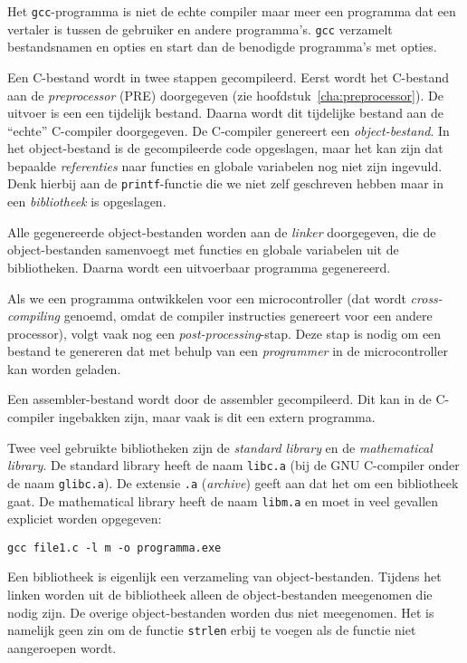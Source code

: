 Het \texttt{gcc}-programma is niet de echte compiler maar meer een programma dat een vertaler is tussen de gebruiker en andere programma's. \texttt{gcc} verzamelt bestandsnamen en opties en start dan de benodigde programma's met opties.

Een C-bestand wordt in twee stappen gecompileerd. Eerst wordt het C-bestand aan de \textsl{preprocessor} (PRE) doorgegeven (zie hoofdstuk~\ref{cha:preprocessor}). De uitvoer is een een tijdelijk bestand. Daarna wordt dit tijdelijke bestand aan de ``echte'' C-compiler doorgegeven. De C-compiler genereert een \textsl{object-bestand}. In het object-bestand is de gecompileerde code opgeslagen, maar het kan zijn dat bepaalde \textsl{referenties} naar functies en globale variabelen nog niet zijn ingevuld. Denk hierbij aan de \texttt{printf}-functie die we niet zelf geschreven hebben maar in een \textsl{bibliotheek} is opgeslagen.

Alle gegenereerde object-bestanden worden aan de \textsl{linker} doorgegeven, die de object-bestanden samenvoegt met functies en globale variabelen uit de bibliotheken. Daarna wordt een uitvoerbaar programma gegenereerd.

Als we een programma ontwikkelen voor een microcontroller (dat wordt \textsl{cross-compiling} genoemd, omdat de compiler instructies genereert voor een andere processor), volgt vaak nog een \textsl{post-processing}-stap. Deze stap is nodig om een bestand te genereren dat met behulp van een \textsl{programmer} in de microcontroller kan worden geladen.

Een assembler-bestand wordt door de assembler gecompileerd. Dit kan in de C-compiler ingebakken zijn, maar vaak is dit een extern programma.

Twee veel gebruikte bibliotheken zijn de \textsl{standard library} en de \textsl{mathematical library}. De standard library heeft de naam \texttt{libc.a} (bij de GNU C-compiler onder de naam \texttt{glibc.a}). De extensie \texttt{.a} (\textsl{archive}) geeft aan dat het om een bibliotheek gaat. De mathematical library heeft de naam \texttt{libm.a} en moet in veel gevallen expliciet worden opgegeven:

\hspace*{1em}\texttt{gcc file1.c -l m -o programma.exe}

Een bibliotheek is eigenlijk een verzameling van object-bestanden. Tijdens het linken worden uit de bibliotheek alleen de object-bestanden meegenomen die nodig zijn. De overige object-bestanden worden dus niet meegenomen. Het is namelijk geen zin om de functie \texttt{strlen} erbij te voegen als de functie niet aangeroepen wordt.

